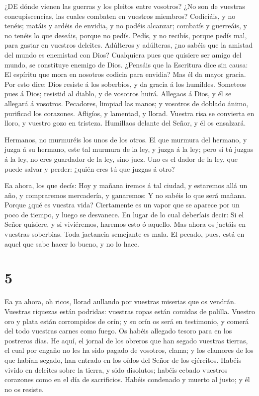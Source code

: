  ¿DE dónde vienen las guerras y los pleitos entre vosotros?
¿No son de vuestras concupiscencias, las cuales combaten en vuestros
miembros?  Codiciáis, y no tenéis; matáis y ardéis de
envidia, y no podéis alcanzar; combatís y guerreáis, y no tenéis lo que
deseáis, porque no pedís.  Pedís, y no recibís, porque pedís
mal, para gastar en vuestros deleites.  Adúlteros y
adúlteras, ¿no sabéis que la amistad del mundo es enemistad con Dios?
Cualquiera pues que quisiere ser amigo del mundo, se constituye enemigo
de Dios.  ¿Pensáis que la Escritura dice sin causa: El
espíritu que mora en nosotros codicia para envidia?  Mas él
da mayor gracia. Por esto dice: Dios resiste á los soberbios, y da
gracia á los humildes.  Someteos pues á Dios; resistid al
diablo, y de vosotros huirá.  Allegaos á Dios, y él se
allegará á vosotros. Pecadores, limpiad las manos; y vosotros de doblado
ánimo, purificad los corazones.  Afligíos, y lamentad, y
llorad. Vuestra risa se convierta en lloro, y vuestro gozo en tristeza.
 Humillaos delante del Señor, y él os ensalzará.

 Hermanos, no murmuréis los unos de los otros. El que
murmura del hermano, y juzga á su hermano, este tal murmura de la ley, y
juzga á la ley; pero si tú juzgas á la ley, no eres guardador de la ley,
sino juez.  Uno es el dador de la ley, que puede salvar y
perder: ¿quién eres tú que juzgas á otro?

 Ea ahora, los que decís: Hoy y mañana iremos á tal ciudad,
y estaremos allá un año, y compraremos mercadería, y ganaremos:
 Y no sabéis lo que será mañana. Porque ¿qué es vuestra
vida? Ciertamente es un vapor que se aparece por un poco de tiempo, y
luego se desvanece.  En lugar de lo cual deberíais decir:
Si el Señor quisiere, y si viviéremos, haremos esto ó aquello.
 Mas ahora os jactáis en vuestras soberbias. Toda jactancia
semejante es mala.  El pecado, pues, está en aquel que sabe
hacer lo bueno, y no lo hace.

\hypertarget{section-4}{%
\section{5}\label{section-4}}

 Ea ya ahora, oh ricos, llorad aullando por vuestras
miserias que os vendrán.  Vuestras riquezas están podridas:
vuestras ropas están comidas de polilla.  Vuestro oro y
plata están corrompidos de orín; y su orín os será en testimonio, y
comerá del todo vuestras carnes como fuego. Os habéis allegado tesoro
para en los postreros días.  He aquí, el jornal de los
obreros que han segado vuestras tierras, el cual por engaño no les ha
sido pagado de vosotros, clama; y los clamores de los que habían segado,
han entrado en los oídos del Señor de los ejércitos.  Habéis
vivido en deleites sobre la tierra, y sido disolutos; habéis cebado
vuestros corazones como en el día de sacrificios.  Habéis
condenado y muerto al justo; y él no os resiste.

